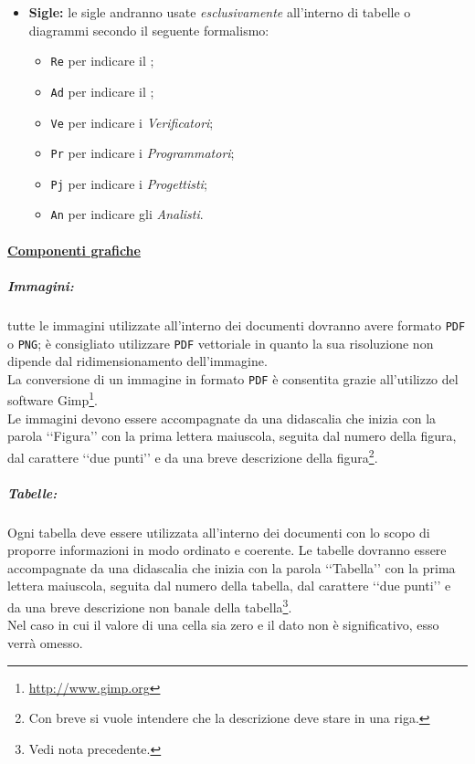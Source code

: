 \begin{itemize}
\item \textbf{Sigle:} le sigle andranno usate \emph{esclusivamente} all'interno di tabelle o diagrammi secondo il seguente formalismo:
\begin{itemize}
\item \verb!Re! per indicare il \projectManager{};
\item \verb!Ad! per indicare il \administrator{};
\item \verb!Ve! per indicare i \emph{Verificatori};
\item \verb!Pr! per indicare i \emph{Programmatori};
\item \verb!Pj! per indicare i \emph{Progettisti};
\item \verb!An! per indicare gli \emph{Analisti}.
\end{itemize} 
\end{itemize}

\paragraph{\underline{Componenti grafiche}}
\label{componentigrafiche}

\subparagraph{Immagini:}
\label{immagini}
tutte le immagini utilizzate all'interno dei documenti dovranno avere formato \verb!PDF!\glossario{} o \verb!PNG!\glossario{}; è consigliato utilizzare \verb!PDF!\glossario{} vettoriale in quanto la sua risoluzione non dipende dal ridimensionamento dell'immagine.
\\La conversione di un immagine in formato \verb!PDF!\glossario{} è consentita grazie all'utilizzo del software Gimp\footnote{\url{http://www.gimp.org}}.
\\Le immagini devono essere accompagnate da una didascalia che inizia con la parola \lq\lq{}Figura\rq\rq{} con la prima lettera maiuscola, seguita dal numero della figura, dal carattere \lq\lq{}due punti\rq\rq{} e da una breve descrizione della figura\footnote{Con breve si vuole intendere che la descrizione deve stare in una riga.}.

\subparagraph{Tabelle:}
\label{tabelle}
Ogni tabella deve essere utilizzata all'interno dei documenti con lo scopo di proporre informazioni in modo ordinato e coerente. Le tabelle dovranno essere accompagnate da una didascalia che inizia con la parola \lq\lq{}Tabella\rq\rq{} con la prima lettera maiuscola, seguita dal numero della tabella, dal carattere \lq\lq{}due punti\rq\rq{} e da una breve descrizione non banale della tabella\footnote{Vedi nota precedente.}.
\\Nel caso in cui il valore di una cella sia zero e il dato non è significativo, esso verrà omesso.

